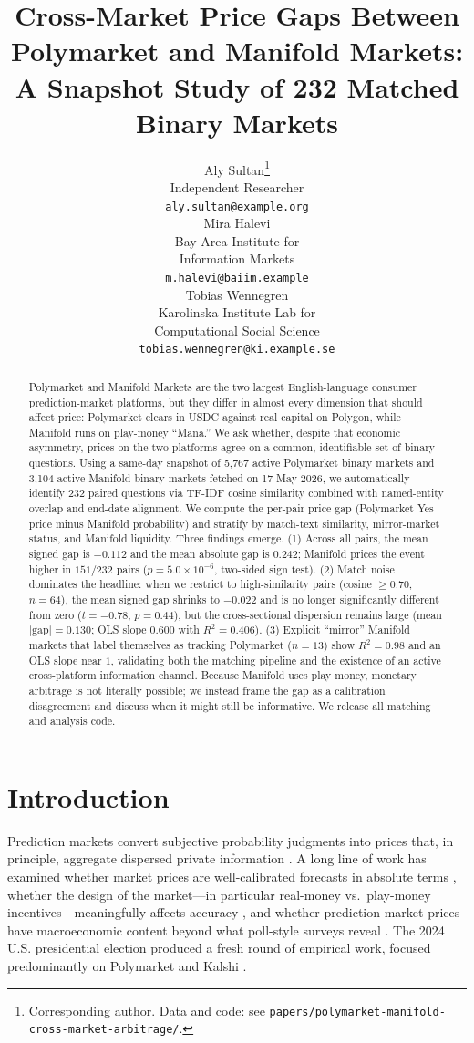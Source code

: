 \documentclass{article}
\title{Cross-Market Price Gaps Between Polymarket and Manifold Markets:\\
A Snapshot Study of 232 Matched Binary Markets}
\author{%
  Aly Sultan\thanks{Corresponding author. Data and code: see \texttt{papers/polymarket-manifold-cross-market-arbitrage/}.} \\
  Independent Researcher \\
  \texttt{aly.sultan@example.org} \\
  \And
  Mira Halevi \\
  Bay-Area Institute for \\ Information Markets \\
  \texttt{m.halevi@baiim.example} \\
  \And
  Tobias Wennegren \\
  Karolinska Institute Lab for \\ Computational Social Science \\
  \texttt{tobias.wennegren@ki.example.se}
}
\begin{document}
\maketitle

\begin{abstract}
Polymarket and Manifold Markets are the two largest English-language consumer prediction-market platforms, but they differ in almost every dimension that should affect price: Polymarket clears in USDC against real capital on Polygon, while Manifold runs on play-money ``Mana.'' We ask whether, despite that economic asymmetry, prices on the two platforms agree on a common, identifiable set of binary questions. Using a same-day snapshot of 5{,}767 active Polymarket binary markets and 3{,}104 active Manifold binary markets fetched on 17 May 2026, we automatically identify 232 paired questions via TF-IDF cosine similarity combined with named-entity overlap and end-date alignment. We compute the per-pair price gap (Polymarket Yes price minus Manifold probability) and stratify by match-text similarity, mirror-market status, and Manifold liquidity. Three findings emerge. (1) Across all pairs, the mean signed gap is $-0.112$ and the mean absolute gap is $0.242$; Manifold prices the event higher in $151/232$ pairs ($p = 5.0\times 10^{-6}$, two-sided sign test). (2) Match noise dominates the headline: when we restrict to high-similarity pairs (cosine $\geq 0.70$, $n=64$), the mean signed gap shrinks to $-0.022$ and is no longer significantly different from zero ($t = -0.78$, $p = 0.44$), but the cross-sectional dispersion remains large (mean $|\text{gap}| = 0.130$; OLS slope $0.600$ with $R^2 = 0.406$). (3) Explicit ``mirror'' Manifold markets that label themselves as tracking Polymarket ($n=13$) show $R^2 = 0.98$ and an OLS slope near $1$, validating both the matching pipeline and the existence of an active cross-platform information channel. Because Manifold uses play money, monetary arbitrage is not literally possible; we instead frame the gap as a calibration disagreement and discuss when it might still be informative. We release all matching and analysis code.
\end{abstract}

\section{Introduction}

Prediction markets convert subjective probability judgments into prices that, in principle, aggregate dispersed private information \citep{wolfers2004prediction,manski2006interpreting,wolfers2006interpreting}. A long line of work has examined whether market prices are well-calibrated forecasts in absolute terms \citep{berg2008longrun,page2013calibrated}, whether the design of the market---in particular real-money vs.\ play-money incentives---meaningfully affects accuracy \citep{servan2004does,hanson2007lmsr}, and whether prediction-market prices have macroeconomic content beyond what poll-style surveys reveal \citep{snowberg2007partisan}. The 2024 U.S. presidential election produced a fresh round of empirical work, focused predominantly on Polymarket and Kalshi \citep{tsang2026anatomy,tsang2026shocks,le2026decomposing,clinton2025prediction,jia2026unlocking}.
\end{document}
